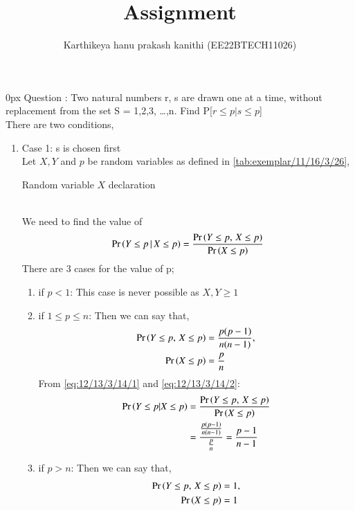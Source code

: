 \documentclass[article]{IEEEtran}
\theoremstyle{remark}
\begin{document}
\let\vec\mathbf


\title{
Assignment
}
\author{ Karthikeya hanu prakash kanithi (EE22BTECH11026)}
\maketitle
\parindent0px
\vspace{3cm}
Question : Two natural numbers r, s are drawn one at a time, without replacement from
the set S = {1,2,3, \ldots,n}. Find P[$r\le p|s\le p$]
\\\solution 
There are two conditions, 
\begin{enumerate}
\item Case 1: s is chosen first
\\Let $X,Y$ and $p$ be random variables as defined in  \autoref{tab:exemplar/11/16/3/26},
\begin{table}[h]
	\centering
	
	\caption{Random variable $X$ declaration}
        \label{tab:exemplar/11/16/3/26}
\end{table}
\\We need to find the value of
\begin{align}
\Pr\left(Y\le p\,|\,X\le p\right) = \frac{\Pr\left(Y \le p, \, X \le p\right)}{\Pr\left(X \le p\right)}
\end{align}
There are 3 cases for the value of p;
\begin{enumerate}
\item if $p<1$:
This case is never possible as $X,Y \ge 1$
\item if $1 \le p \le n$:
Then we can say that,
\begin{align}
\Pr\left(Y \le p, \, X \le p\right) &= \frac{p(p-1)}{n(n-1)} \label{eq:12/13/3/14/1},\\
\Pr\left(X \le p\right) &= \frac{p}{n} \label{eq:12/13/3/14/2}
\end{align}
From \eqref{eq:12/13/3/14/1} and \eqref{eq:12/13/3/14/2}:
\begin{align}
\Pr\left(Y\le p|X\le p\right) &= \frac{\Pr\left(Y \le p, \, X \le p\right)}{\Pr\left(X \le p\right)}\\
&= \frac{\frac{p(p-1)}{n(n-1)}}{\frac{p}{n}}
=\frac{p-1}{n-1}
\end{align}
\item if $p>n$:
Then we can say that,
\begin{align}
\pr{Y \le p, \, X \le p} &= 1 \label{eq:12/13/3/14/3},\\
\pr{X \le p} &= 1 \label{eq:12/13/3/14/4}

\end{align}
\end{enumerate}
\end{enumerate}
\end{document}
